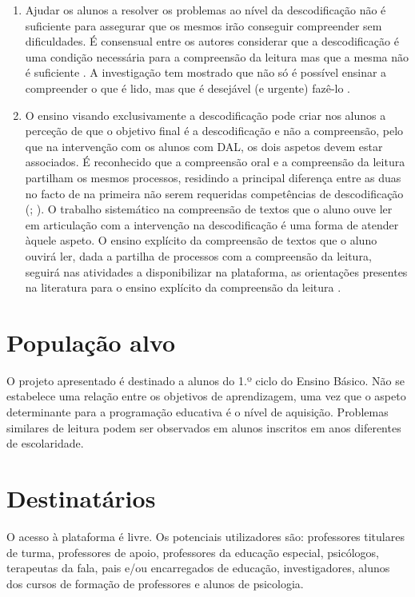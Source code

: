 \documentclass[
  oneside,
  11pt, a4paper,
  footinclude=true,
  headinclude=true,
  cleardoublepage=empty
]{scrbook}
\begin{document}
\begin{enumerate}
  \item Ajudar os alunos a resolver os problemas ao nível da descodificação não é suficiente para assegurar que os mesmos irão conseguir compreender sem dificuldades. É consensual entre os autores considerar que a descodificação é uma condição necessária para a compreensão da leitura mas que a mesma não é suficiente \citep{Nation}. A investigação tem mostrado que não só é possível ensinar a compreender o que é lido, mas que é desejável (e urgente) fazê-lo \citep*{RibeiroViana2010}.
  \item O ensino visando exclusivamente a descodificação pode criar nos alunos a perceção de que o objetivo final é a descodificação e não a compreensão, pelo que na intervenção  com os  alunos  com DAL,  os  dois  aspetos  devem estar  associados. É reconhecido que a compreensão oral e a compreensão da leitura partilham os mesmos processos, residindo a principal diferença entre as duas no facto de na primeira não serem requeridas competências de descodificação (\citealp{RibeiroViana}; \citealp{Spinillo}). O trabalho sistemático na compreensão de textos que o aluno ouve ler em articulação com a intervenção na descodificação é uma forma de atender àquele aspeto. O ensino explícito da compreensão de textos que o aluno ouvirá ler, dada a partilha de processos com a compreensão da leitura, seguirá nas atividades a disponibilizar na plataforma, as orientações presentes na literatura para o ensino explícito da compreensão da leitura \citep{SimSim}.
\end{enumerate}

\chapter{População alvo}
O projeto apresentado é destinado a alunos do 1.º ciclo do Ensino Básico. Não se estabelece uma relação entre os objetivos de aprendizagem, uma vez que o aspeto determinante para a programação educativa é o nível de aquisição. Problemas similares de leitura podem ser observados em alunos inscritos em anos diferentes de escolaridade.

\chapter{Destinatários}
O acesso à plataforma é livre. Os potenciais utilizadores são: professores titulares de turma, professores de apoio, professores da educação especial, psicólogos, terapeutas da fala, pais e/ou encarregados de educação, investigadores, alunos dos cursos de formação de professores e alunos de psicologia.


\cleardoublepage


\end{document}
